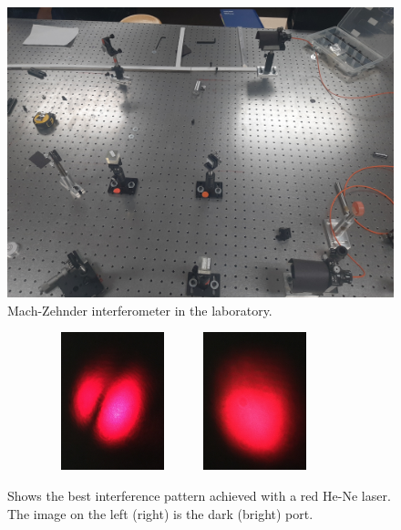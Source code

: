 \documentclass[12pt]{book}
\begin{document}
\begin{figure}[t!]
\centering
\includegraphics[scale=0.08]{images/666.jpg}
\caption{Mach-Zehnder interferometer in the laboratory.}
\label{666}
\end{figure}

\begin{figure}[t!]

\begin{subfigure}[b]{\linewidth}
\centering
\includegraphics[width=4cm,height=4cm]{images/Fig62dark.jpg}
\includegraphics[width=4cm,height=4cm]{images/Fig62bright.jpg}

\end{subfigure}

\caption{Shows the best interference pattern achieved with a red He-Ne laser. The image on the left (right) is the dark (bright) port.}
\label{best}
\end{figure}
\end{document}
